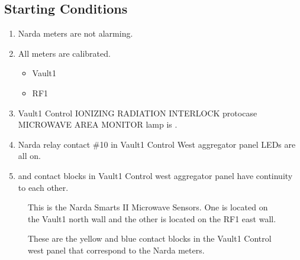 \documentclass[letterpaper,10pt,english]{sphinxmanual}
\begin{document}
\subsection{Starting Conditions}
\label{\detokenize{testing_documentation/narda_testing:starting-conditions}}\begin{enumerate}
%
\item {} 
\sphinxAtStartPar
Narda meters are not alarming.

\item {} 
\sphinxAtStartPar
All meters are calibrated.
\begin{itemize}
\item {} 
\sphinxAtStartPar
Vault\sphinxhyphen{}1

\item {} 
\sphinxAtStartPar
RF\sphinxhyphen{}1

\end{itemize}

\item {} 
\sphinxAtStartPar
Vault\sphinxhyphen{}1 Control IONIZING RADIATION INTERLOCK protocase MICROWAVE AREA MONITOR lamp is .

\item {} 
\sphinxAtStartPar
Narda relay contact \#10 in Vault\sphinxhyphen{}1 Control West aggregator panel LEDs are all on.

\item {} 
\sphinxAtStartPar
{} and  contact blocks in Vault\sphinxhyphen{}1 Control west aggregator panel have continuity to each other.

\end{enumerate}

\begin{figure}[htbp]
\centering
\capstart

\noindent{}
\caption{ This is the Narda Smarts II Microwave Sensors.
One is located on the Vault\sphinxhyphen{}1 north wall and the other is located on the RF\sphinxhyphen{}1 east wall.}\label{\detokenize{testing_documentation/narda_testing:id1}}\end{figure}

\begin{figure}[htbp]
\centering
\capstart

\noindent{}
\caption{ These are the yellow and blue contact blocks in the Vault\sphinxhyphen{}1 Control west panel that correspond to the Narda meters.}\label{\detokenize{testing_documentation/narda_testing:id2}}\end{figure}
\end{document}
